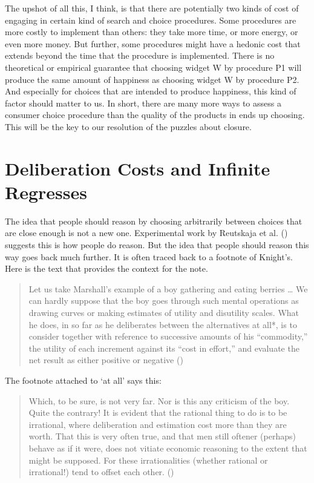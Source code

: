 \documentclass[
  10pt,
  letterpaper,
  twoside]{scrbook}
\begin{document}
The upshot of all this, I think, is that there are potentially two kinds
of cost of engaging in certain kind of search and choice procedures.
Some procedures are more costly to implement than others: they take more
time, or more energy, or even more money. But further, some procedures
might have a hedonic cost that extends beyond the time that the
procedure is implemented. There is no theoretical or empirical guarantee
that choosing widget W by procedure P1 will produce the same amount of
happiness as choosing widget W by procedure P2. And especially for
choices that are intended to produce happiness, this kind of factor
should matter to us. In short, there are many more ways to assess a
consumer choice procedure than the quality of the products in ends up
choosing. This will be the key to our resolution of the puzzles about
closure.

\section{Deliberation Costs and Infinite
Regresses}\label{sec-deliberationcosts}

The idea that people should reason by choosing arbitrarily between
choices that are close enough is not a new one. Experimental work by
Reutskaja et al. () suggests this is
how people do reason. But the idea that people should reason this way
goes back much further. It is often traced back to a footnote of
Knight's. Here is the text that provides the context for the note.

\begin{quote}
Let us take Marshall's example of a boy gathering and eating berries
\ldots{} We can hardly suppose that the boy goes through such mental
operations as drawing curves or making estimates of utility and
disutility scales. What he does, in so far as he deliberates between the
alternatives at all*, is to consider together with reference to
successive amounts of his ``commodity,'' the utility of each increment
against its ``cost in effort,'' and evaluate the net result as either
positive or negative ()
\end{quote}

The footnote attached to `at all' says this:

\begin{quote}
Which, to be sure, is not very far. Nor is this any criticism of the
boy. Quite the contrary! It is evident that the rational thing to do is
to be irrational, where deliberation and estimation cost more than they
are worth. That this is very often true, and that men still oftener
(perhaps) behave as if it were, does not vitiate economic reasoning to
the extent that might be supposed. For these irrationalities (whether
rational or irrational!) tend to offset each other.
()
\end{quote}
\end{document}
